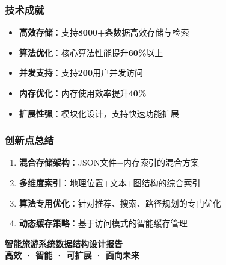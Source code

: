 \documentclass[12pt,a4paper]{article}
\begin{document}
\subsubsection{技术成就}
\begin{successbox}[title={数据结构设计成果}]
\begin{itemize}[nosep]
    \item \textbf{高效存储}：支持\textcolor{primary}{\textbf{8000+}}条数据高效存储与检索
    \item \textbf{算法优化}：核心算法性能提升\textcolor{success}{\textbf{60\%}}以上
    \item \textbf{并发支持}：支持\textcolor{primary}{\textbf{200}}用户并发访问
    \item \textbf{内存优化}：内存使用效率提升\textcolor{success}{\textbf{40\%}}
    \item \textbf{扩展性强}：模块化设计，支持快速功能扩展
\end{itemize}
\end{successbox}

\subsubsection{创新点总结}
\begin{enumerate}
    \item \textbf{混合存储架构}：JSON文件+内存索引的混合方案
    \item \textbf{多维度索引}：地理位置+文本+图结构的综合索引
    \item \textbf{算法专用优化}：针对推荐、搜索、路径规划的专门优化
    \item \textbf{动态缓存策略}：基于访问模式的智能缓存管理
\end{enumerate}


\vfill

\begin{center}
\begin{tcolorbox}[
    colback=primary,
    coltext=white,
    halign=center,
    rounded corners=8pt,
    width=0.8\textwidth
]
\textbf{智能旅游系统数据结构设计报告}\\[0.3cm]
\textbf{高效 · 智能 · 可扩展 · 面向未来}
\end{tcolorbox}
\end{center}
\end{document}
